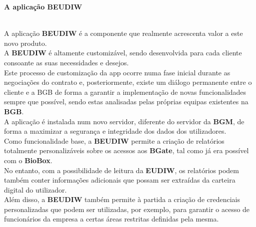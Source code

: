 \documentclass[12pt,a4paper]{article}
\begin{document}
{\begin{small}
\begin{normalsize}
\textbf{A aplicação BEUDIW}
\end{normalsize}\\
A aplicação \textbf{BEUDIW} é a componente que realmente acrescenta valor a este novo produto.\\
A \textbf{BEUDIW} é altamente customizável, sendo desenvolvida para cada cliente consoante as suas necessidades e desejos.\\
Este processo de customização da app ocorre numa fase inicial durante as negociações do contrato e, posteriormente, existe um diálogo permanente entre o cliente e a BGB de forma a garantir a implementação de novas funcionalidades sempre que possível, sendo estas analisadas pelas próprias equipas existentes na \textbf{BGB}.\\
A aplicação é instalada num novo servidor, diferente do servidor da \textbf{BGM}, de forma a maximizar a segurança e integridade dos dados dos utilizadores.\\
Como funcionalidade base, a \textbf{BEUDIW} permite a criação de relatórios totalmente personalizáveis sobre os acessos aos \textbf{BGate}, tal como já era possível com o \textbf{BioBox}.\\
No entanto, com a possibilidade de leitura da \textbf{EUDIW}, os relatórios podem também conter informações adicionais que possam ser extraídas da carteira digital do utilizador.\\
Além disso, a \textbf{BEUDIW} também permite à partida a criação de credenciais personalizadas que podem ser utilizadas, por exemplo, para garantir o acesso de funcionários da empresa a certas áreas restritas definidas pela mesma.\\


\end{small}}
\end{document}
